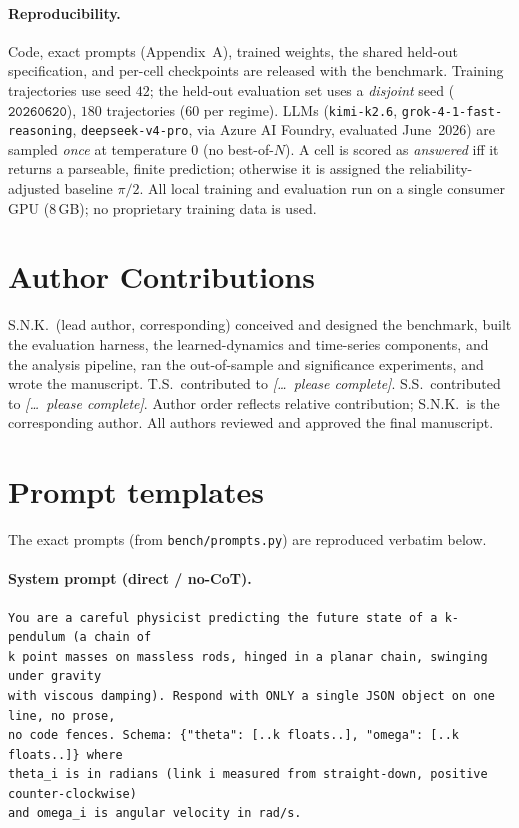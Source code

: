 \documentclass{article}
\begin{document}
\paragraph{Reproducibility.} Code, exact prompts (Appendix~A), trained weights, the
shared held-out specification, and per-cell checkpoints are released with the benchmark.
Training trajectories use seed $42$; the held-out evaluation set uses a \emph{disjoint}
seed ($\texttt{20260620}$), $180$ trajectories ($60$ per regime). LLMs
(\texttt{kimi-k2.6}, \texttt{grok-4-1-fast-reasoning}, \texttt{deepseek-v4-pro}, via
Azure AI Foundry, evaluated June~2026) are sampled \emph{once} at temperature $0$ (no
best-of-$N$). A cell is scored as \emph{answered} iff it returns a parseable, finite
prediction; otherwise it is assigned the reliability-adjusted baseline $\pi/2$. All local
training and evaluation run on a single consumer GPU (8\,GB); no proprietary training
data is used.

\section*{Author Contributions}
S.N.K.\ (lead author, corresponding) conceived and designed the benchmark, built the
evaluation harness, the learned-dynamics and time-series components, and the analysis
pipeline, ran the out-of-sample and significance experiments, and wrote the manuscript.
T.S.\ contributed to \emph{[\dots\ please complete]}. S.S.\ contributed to
\emph{[\dots\ please complete]}. Author order reflects relative contribution; S.N.K.\ is
the corresponding author. All authors reviewed and approved the final manuscript.

\small



\appendix
\section{Prompt templates}
The exact prompts (from \texttt{bench/prompts.py}) are reproduced verbatim below.

\paragraph{System prompt (direct / no-CoT).}
\begin{small}\begin{verbatim}
You are a careful physicist predicting the future state of a k-pendulum (a chain of
k point masses on massless rods, hinged in a planar chain, swinging under gravity
with viscous damping). Respond with ONLY a single JSON object on one line, no prose,
no code fences. Schema: {"theta": [..k floats..], "omega": [..k floats..]} where
theta_i is in radians (link i measured from straight-down, positive counter-clockwise)
and omega_i is angular velocity in rad/s.
\end{verbatim}\end{small}
\end{document}
